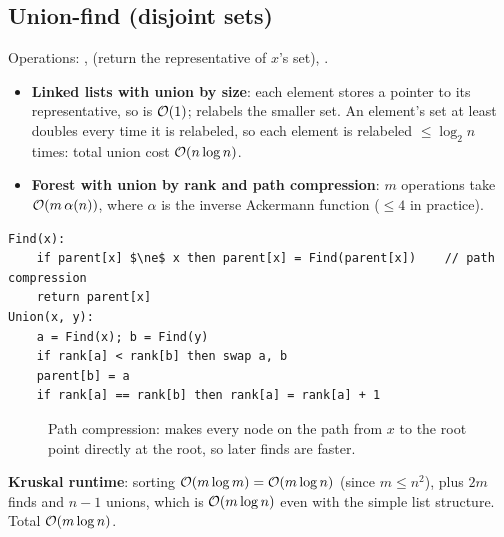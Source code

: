 \subsection{Union-find (disjoint sets)}
Operations: ,  (return the representative of $x$'s set), .
\begin{itemize}
  \item \textbf{Linked lists with union by size}: each element stores a pointer to its representative, so  is $\mathcal{O}(1)$;  relabels the smaller set.
        An element's set at least doubles every time it is relabeled, so each element is relabeled $\le\log_2 n$ times: total union cost $\mathcal{O}(n\log n)$.
  \item \textbf{Forest with union by rank and path compression}: $m$ operations take $\mathcal{O}(m\,\alpha(n))$, where $\alpha$ is the inverse Ackermann function ($\le4$ in practice).
\end{itemize}
\begin{lstlisting}[style=pseudo]
Find(x):
    if parent[x] $\ne$ x then parent[x] = Find(parent[x])    // path compression
    return parent[x]
Union(x, y):
    a = Find(x); b = Find(y)
    if rank[a] < rank[b] then swap a, b
    parent[b] = a
    if rank[a] == rank[b] then rank[a] = rank[a] + 1
\end{lstlisting}

\begin{figure}[H]
\centering
{}
\caption{Path compression:  makes every node on the path from
$x$ to the root point directly at the root, so later finds are faster.}
\end{figure}
\textbf{Kruskal runtime}: sorting $\mathcal{O}(m\log m)=\mathcal{O}(m\log n)$ (since $m\le n^2$), plus $2m$ finds and $n-1$ unions, which is $\mathcal{O}(m\log n)$ even with the simple list
structure. Total $\mathcal{O}(m\log n)$.

